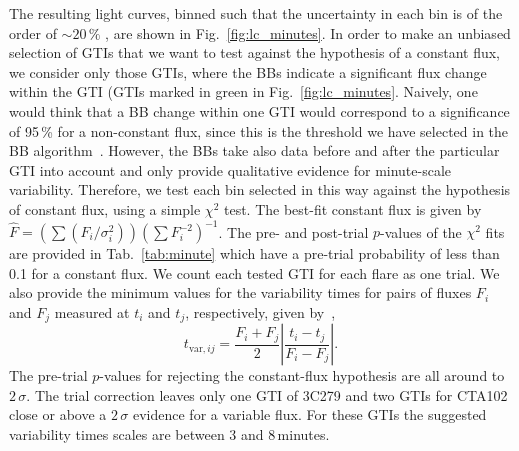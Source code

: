 \documentclass[twocolumn]{aastex62}
\begin{document}
The resulting light curves, binned such that the uncertainty in each bin is of the order of $\sim20\,\%$ \citep[using the adaptive binning introduced by][]{lott2012}, are shown in Fig.~\ref{fig:lc_minutes}. 
In order to make an unbiased selection of GTIs that we want to test against the hypothesis of a constant flux, we consider only those GTIs, where the BBs indicate a significant flux change within the GTI (GTIs marked in green in Fig.~\ref{fig:lc_minutes}.
Naively, one would think that a BB change within one GTI would correspond to a significance of 95\,\% for a non-constant flux, since this is the threshold we have selected in the BB algorithm~\citep{2013ApJ...764..167S}. However, the BBs take also data  before and after the particular GTI into account and only provide qualitative evidence for minute-scale variability. 
Therefore, we test each bin selected in this way against the hypothesis of constant flux, using a simple $\chi^2$ test. 
The best-fit constant flux is given by $\hat{F} = (\sum (F_i / \sigma_i^2))(\sum F_i^{-2})^{-1}$. 
The pre- and post-trial $p$-values of the $\chi^2$ fits are provided in Tab.~\ref{tab:minute} which have a pre-trial probability of less than 0.1 for a constant flux. We count each tested GTI for each flare as one trial. 
We also provide the minimum values for the variability times for pairs of fluxes $F_i$ and $F_j$ measured at $t_i$ and $t_j$, respectively, given by~\citet{1999ApJ...527..719Z},
\begin{equation}
t_{\mathrm{var},ij} = \frac{F_i + F_j}{2}\left|\frac{t_i - t_j}{F_i - F_j}\right|.
\end{equation}
The pre-trial $p$-values for rejecting the constant-flux hypothesis are all around to $2\,\sigma$. 
The trial correction leaves only one GTI of 3C279 and two GTIs for CTA102 close or above a $2\,\sigma$ evidence for a variable flux. 
For these GTIs the suggested variability times scales are between 3 and 8\,minutes.
\end{document}
